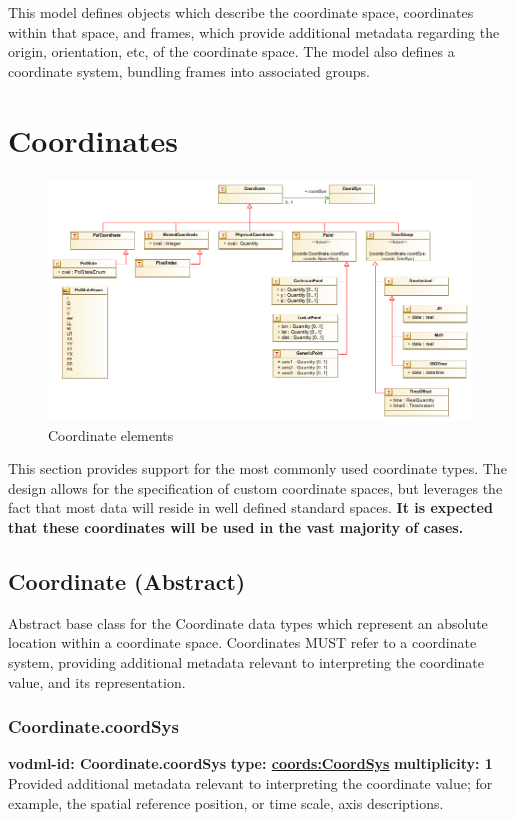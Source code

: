  This model defines objects which describe the coordinate space, coordinates within that space, and frames, which provide additional metadata regarding the origin, orientation, etc, of the coordinate space. The model also defines a coordinate system, bundling frames into associated groups.

\pagebreak
\section{Coordinates}

  \begin{figure}[h]
  \begin{center}
    \includegraphics[width=6in]{diagrams/Coordinates.png}
    \caption{Coordinate elements}\label{fig:coordinates}
  \end{center}
  \end{figure}

  This section provides support for the most commonly used coordinate types.  The design allows for the specification of custom coordinate spaces, but leverages the fact that most data will reside in well defined standard spaces.  \textbf{It is expected that these coordinates will be used in the vast majority of cases.}


  \subsection{Coordinate (Abstract)}
  \label{sect:Coordinate}
    Abstract base class for the Coordinate data types which represent an absolute location within a coordinate space. Coordinates MUST refer to a coordinate system, providing additional metadata relevant to interpreting the coordinate value, and its representation.

    \subsubsection{Coordinate.coordSys}
      \textbf{vodml-id: Coordinate.coordSys} \newline
      \textbf{type: \hyperref[sect:CoordSys]{coords:CoordSys}} \newline
      \textbf{multiplicity: 1} \newline 
      Provided additional metadata relevant to interpreting the coordinate value; for example, the spatial reference position, or time scale, axis descriptions.


